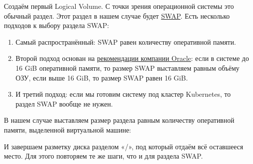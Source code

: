 \documentclass[14pt, a4paper]{article}
\begin{document}
Создаём первый Logical Volume. С точки зрения операционной системы это обычный раздел.
Этот раздел в нашем случае будет \href{https://help.ubuntu.ru/wiki/swap}{SWAP}. Есть несколько подходов к выбору раздела SWAP:
\begin{enumerate}
    \item Самый распространённый: SWAP равен количеству оперативной памяти.
    \item Второй подход основан на \href{http://www.dba-oracle.com/t_linux_installation.htm}{рекомендации компании Oracle}: если в системе до 16 GiB
    оперативной памяти, то размер SWAP выставляем равным объёму ОЗУ, если выше 16 GiB, то
    размер SWAP равен 16 GiB.
    \item И третий подход: если мы готовим систему под кластер Kubernetes, то раздел SWAP вообще
    не нужен.
\end{enumerate}
В нашем случае выставляем размер раздела равным количеству оперативной памяти,
выделенной виртуальной машине:
\begin{figure}[h]%
    \centering
    \label{1.9} %
\end{figure}
И завершаем разметку диска разделом «/», под который отдаём всё оставшееся место. Для
этого повторяем те же шаги, что и для раздела SWAP.
\end{document}
